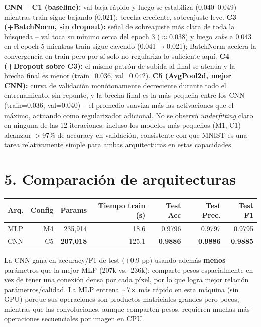 \documentclass[9pt]{extarticle}
\begin{document}
\textbf{CNN -- C1 (baseline):} val baja rápido y luego se estabiliza (0.040--0.049) mientras train sigue bajando (0.021): brecha creciente, sobreajuste leve. \textbf{C3 (+BatchNorm, sin dropout):} señal de sobreajuste más clara de toda la búsqueda -- val toca su mínimo cerca del epoch 3 ($\approx$0.038) y luego \emph{sube} a 0.043 en el epoch 5 mientras train sigue cayendo (0.041$\to$0.021); BatchNorm acelera la convergencia en train pero por sí solo no regulariza lo suficiente aquí. \textbf{C4 (+Dropout sobre C3):} el mismo patrón de subida al final se atenúa y la brecha final es menor (train=0.036, val=0.042). \textbf{C5 (AvgPool2d, mejor CNN):} curva de validación monótonamente decreciente durante todo el entrenamiento, sin repunte, y la brecha final es la más pequeña entre los CNN (train=0.036, val=0.040) -- el promedio suaviza más las activaciones que el máximo, actuando como regularizador adicional. No se observó \emph{underfitting} claro en ninguna de las 12 iteraciones: incluso los modelos más pequeños (M1, C1) alcanzan $>$97\% de accuracy en validación, consistente con que MNIST es una tarea relativamente simple para ambas arquitecturas en estas capacidades.

\section*{5. Comparación de arquitecturas}
\begin{center}
\begin{tabular}{@{}lrrrrrr@{}}
\toprule
\textbf{Arq.} & \textbf{Config} & \textbf{Params} & \textbf{Tiempo train (s)} & \textbf{Test Acc} & \textbf{Test Prec.} & \textbf{Test F1} \\
\midrule
MLP & M4 & 235,914 & 18.6 & 0.9796 & 0.9797 & 0.9795 \\
CNN & C5 & \textbf{207,018} & 125.1 & \textbf{0.9886} & \textbf{0.9886} & \textbf{0.9885} \\
\bottomrule
\end{tabular}
\end{center}
La CNN gana en accuracy/F1 de test (+0.9 pp) usando además \textbf{menos} parámetros que la mejor MLP (207k vs.\ 236k): comparte pesos espacialmente en vez de tener una conexión densa por cada píxel, por lo que logra mejor relación parámetros/calidad. La MLP entrena $\sim$7$\times$ más rápido en esta máquina (sin GPU) porque sus operaciones son productos matriciales grandes pero pocos, mientras que las convoluciones, aunque comparten pesos, requieren muchas más operaciones secuenciales por imagen en CPU.
\end{document}
